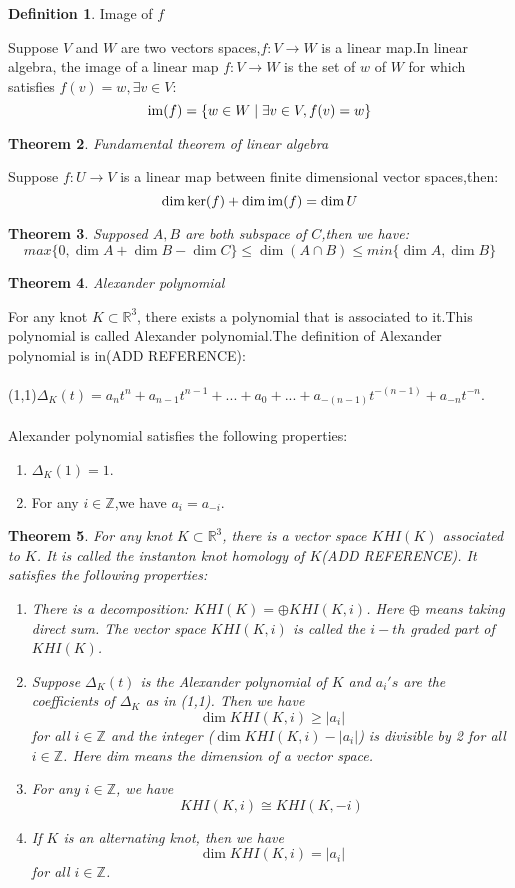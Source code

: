 \documentclass{amsart}
\newtheorem{thm}{Theorem}[section]
\theoremstyle{definition}
\newtheorem{defn}[thm]{Definition}
\newcommand{\im}{{\rm im}}
\begin{document}
\begin{defn}
Image of $f$
\end{defn}
Suppose $V$ and $W$ are two vectors spaces,$f:V\rightarrow W$ is a linear map.In linear algebra, the image of a linear map $f:V\rightarrow W$ is the set of $w$ of $W$ for which satisfies $f(v)=w,\exists v \in V$:
\[\im (f)= \{w\in W \mid\exists v\in V,f(v)= w\}\]

\begin{thm}
Fundamental theorem of linear algebra
\end{thm}
Suppose $f:U\rightarrow V$ is a linear map between finite dimensional vector spaces,then:
\[\dim \ker(f)+\dim \im(f)=\dim U\]

\begin{thm}
Supposed $A, B$ are both subspace of $C$,then we have:
\[max\{0,\dim A+\dim B-\dim C\}\leq \dim(A\cap B)\leq min\{\dim A, \dim B\}\]
\end{thm}

\begin{thm}
Alexander polynomial
\end{thm}
For any knot $K\subset \mathbb{R}^3$, there exists a polynomial that is associated to it.This polynomial is called Alexander polynomial.The definition of Alexander polynomial is in(ADD REFERENCE):\\\\
(1,1)\;\;\;\;\;\;\;\;\;\;\;\;\;\;$\Delta_K(t)=a_{n}t^{n}+a_{n-1}t^{n-1}+...+a_{0}+...+a_{-(n-1)}t^{-(n-1)}+a_{-n}t^{-n}.$\\\\
Alexander polynomial satisfies the following properties:
\begin{enumerate}
\item
$\Delta_K(1)=1.$
\item
For any $i\in\mathbb{Z}$,we have $a_{i}=a_{-i}.$
\end{enumerate}

\begin{thm}
For any knot $K \subset\mathbb{R}^3$, there is a vector space $KHI(K)$ associated to $K$. It is called the instanton knot homology of $K$(ADD REFERENCE). It satisfies the following properties:
\begin{enumerate}
\item
There is a decomposition:
$KHI(K)=\oplus KHI(K,i)$.
Here $\oplus$ means taking direct sum. The vector space $KHI(K,i)$ is called the $i-th$ graded part of $KHI(K)$.
\item
Suppose $\Delta_K(t)$ is the Alexander polynomial of $K$ and $a_{i}'s$ are the coefficients of $\Delta_K$ as in (1,1). Then we have
\[\dim KHI(K,i)\geq |a_{i}|\]
for all $i\in\mathbb{Z}$ and the integer ($\dim KHI(K,i)-|a_{i}|$) is divisible by 2 for all $i\in\mathbb{Z}$. Here dim means the dimension of a vector space.
\item
For any $i\in\mathbb{Z}$, we have
\[KHI(K,i)\cong KHI(K,-i)\]
\item
If $K$ is an alternating knot, then we have
\[\dim KHI(K,i)=|a_{i}|\]
for all $i\in\mathbb{Z}$.
\end{enumerate}
\end{thm}
\end{document}
